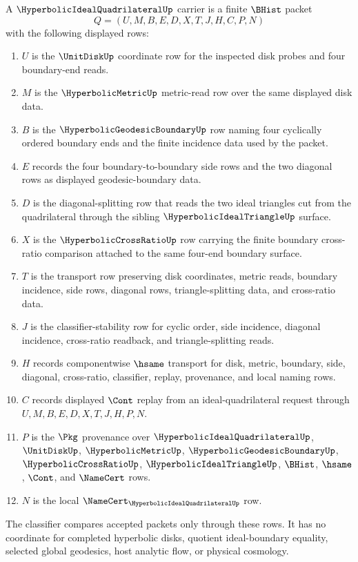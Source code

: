 \begin{definition}
\label{def:hyperbolic-ideal-quadrilateral-carrier}
A $\HyperbolicIdealQuadrilateralUp$ carrier is a finite $\BHist$ packet
$$
Q=(U,M,B,E,D,X,T,J,H,C,P,N)
$$
with the following displayed rows:
\begin{enumerate}
\item $U$ is the $\UnitDiskUp$ coordinate row for the inspected disk probes and four boundary-end reads.
\item $M$ is the $\HyperbolicMetricUp$ metric-read row over the same displayed disk data.
\item $B$ is the $\HyperbolicGeodesicBoundaryUp$ row naming four cyclically ordered boundary ends and the finite incidence data used by the packet.
\item $E$ records the four boundary-to-boundary side rows and the two diagonal rows as displayed geodesic-boundary data.
\item $D$ is the diagonal-splitting row that reads the two ideal triangles cut from the quadrilateral through the sibling $\HyperbolicIdealTriangleUp$ surface.
\item $X$ is the $\HyperbolicCrossRatioUp$ row carrying the finite boundary cross-ratio comparison attached to the same four-end boundary surface.
\item $T$ is the transport row preserving disk coordinates, metric reads, boundary incidence, side rows, diagonal rows, triangle-splitting data, and cross-ratio data.
\item $J$ is the classifier-stability row for cyclic order, side incidence, diagonal incidence, cross-ratio readback, and triangle-splitting reads.
\item $H$ records componentwise $\hsame$ transport for disk, metric, boundary, side, diagonal, cross-ratio, classifier, replay, provenance, and local naming rows.
\item $C$ records displayed $\Cont$ replay from an ideal-quadrilateral request through $U,M,B,E,D,X,T,J,H,P,N$.
\item $P$ is the $\Pkg$ provenance over $\HyperbolicIdealQuadrilateralUp$, $\UnitDiskUp$, $\HyperbolicMetricUp$, $\HyperbolicGeodesicBoundaryUp$, $\HyperbolicCrossRatioUp$, $\HyperbolicIdealTriangleUp$, $\BHist$, $\hsame$, $\Cont$, and $\NameCert$ rows.
\item $N$ is the local $\NameCert_{\HyperbolicIdealQuadrilateralUp}$ row.
\end{enumerate}
The classifier compares accepted packets only through these rows. It has no coordinate for completed hyperbolic disks, quotient ideal-boundary equality, selected global geodesics, host analytic flow, or physical cosmology.
\end{definition}

